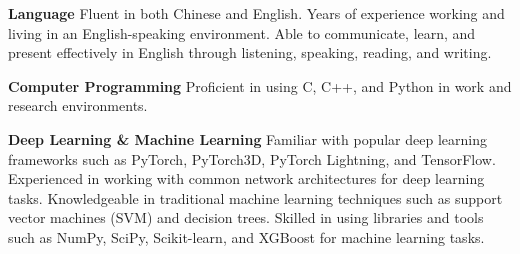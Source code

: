 \begin{cvparagraph}
	
\textbf{Language}
Fluent in both Chinese and English.
Years of experience working and living in an English-speaking environment.
Able to communicate, learn, and present effectively in English through listening, speaking, reading, and writing.

\textbf{Computer Programming}
Proficient in using C, C++, and Python in work and research environments.

\textbf{Deep Learning \& Machine Learning}
Familiar with popular deep learning frameworks such as PyTorch, PyTorch3D, PyTorch Lightning, and TensorFlow.
Experienced in working with common network architectures for deep learning tasks.
Knowledgeable in traditional machine learning techniques such as support vector machines (SVM) and decision trees.
Skilled in using libraries and tools such as NumPy, SciPy, Scikit-learn, and XGBoost for machine learning tasks.
\end{cvparagraph}

